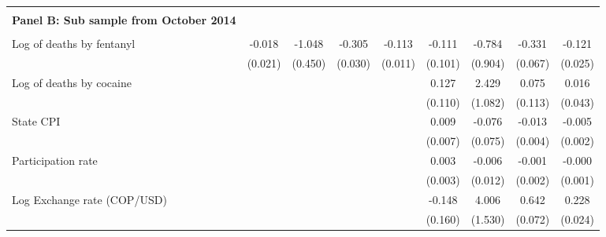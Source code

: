 \begin{tabular}{lcccccccc}
 \hline  & & & & &  &  &  &  \\ \textbf{Panel B: Sub sample from October 2014} \\ & & & & & & & & \\
Log of deaths by fentanyl&      -0.018         &      -1.048\sym{*}  &      -0.305\sym{***}&      -0.113\sym{***}&      -0.111         &      -0.784         &      -0.331\sym{***}&      -0.121\sym{***}\\
                    &     (0.021)         &     (0.450)         &     (0.030)         &     (0.011)         &     (0.101)         &     (0.904)         &     (0.067)         &     (0.025)         \\
\addlinespace
Log of deaths by cocaine&                     &                     &                     &                     &       0.127         &       2.429\sym{*}  &       0.075         &       0.016         \\
                    &                     &                     &                     &                     &     (0.110)         &     (1.082)         &     (0.113)         &     (0.043)         \\
\addlinespace
State CPI           &                     &                     &                     &                     &       0.009         &      -0.076         &      -0.013\sym{**} &      -0.005\sym{**} \\
                    &                     &                     &                     &                     &     (0.007)         &     (0.075)         &     (0.004)         &     (0.002)         \\
\addlinespace
Participation rate  &                     &                     &                     &                     &       0.003         &      -0.006         &      -0.001         &      -0.000         \\
                    &                     &                     &                     &                     &     (0.003)         &     (0.012)         &     (0.002)         &     (0.001)         \\
\addlinespace
Log Exchange rate (COP/USD)&                     &                     &                     &                     &      -0.148         &       4.006\sym{**} &       0.642\sym{***}&       0.228\sym{***}\\
                    &                     &                     &                     &                     &     (0.160)         &     (1.530)         &     (0.072)         &     (0.024)         \\

\end{tabular}
